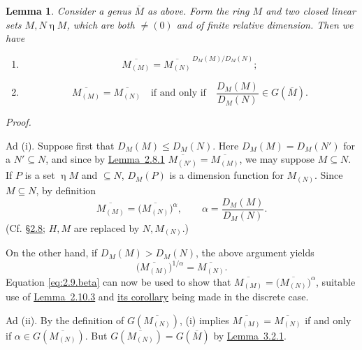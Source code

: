 \documentclass[b5paper,twoside]{article}
\newcommand{\secref}[2]{\hyperref[#1]{\mbox{\S#2}}}
\newcommand{\lemref}[2]{\hyperref[#1]{\mbox{Lemma~#2}}}
\theoremstyle{mvnplain}
\newtheorem{lemma}{Lemma}[section]
\renewenvironment{proof}[1][Proof]{%
  \par\addvspace{0.35\baselineskip}%
  \noindent\textit{#1.}\ \normalfont\ignorespaces
}{%
  \par\addvspace{0.35\baselineskip}%
}
\newcommand{\M}{\mathbf M}
\newcommand{\Hilbert}{\mathfrak H}
\def\M{M}%
\def\Hilbert{H}%
\def\widetilde#1{#1}%
\def\mathfrak#1{#1}%
\begin{document}
\begin{lemma}\label{lem:3.2.2}
Consider a genus \(\widetilde{\overline{\M}}\) as above. Form the ring
\(\M\) and two closed linear sets \(\mathfrak M,\mathfrak N\mathrel{\eta}\M\), which
are both \(\ne(0)\) and of finite relative dimension. Then we have
\begin{enumerate}[label=(\roman*)]
\item
\[
  \overline{\M_{(\mathfrak M)}}
  =\overline{\M_{(\mathfrak N)}}^{\,D_{\M}(\mathfrak M)/D_{\M}(\mathfrak N)};
\]
\item
\[
  \overline{\M_{(\mathfrak M)}}=\overline{\M_{(\mathfrak N)}}
  \quad\text{if and only if}\quad
  \frac{D_{\M}(\mathfrak M)}{D_{\M}(\mathfrak N)}
  \in\mathfrak G(\widetilde{\overline{\M}}).
\]
\end{enumerate}
\end{lemma}

\begin{proof}
Ad (i). Suppose first that
\(D_{\M}(\mathfrak M)\leq D_{\M}(\mathfrak N)\). Here
\(D_{\M}(\mathfrak M)=D_{\M}(\mathfrak N')\) for a
\(\mathfrak N'\subseteq\mathfrak N\), and since by
\lemref{lem:2.8.1}{2.8.1}
\(\overline{\M_{(\mathfrak N')}}=\overline{\M_{(\mathfrak M)}}\), we may
suppose \(\mathfrak M\subseteq\mathfrak N\). If \(\mathfrak P\) is a set
\(\mathrel{\eta}\M\) and \(\subseteq\mathfrak N\), \(D_{\M}(\mathfrak P)\) is a
dimension function for \(\M_{(\mathfrak N)}\). Since
\(\mathfrak M\subseteq\mathfrak N\), by definition
\[
  \overline{\M_{(\mathfrak M)}}
  =\bigl(\overline{\M_{(\mathfrak N)}}\bigr)^\alpha,
  \qquad
  \alpha=\frac{D_{\M}(\mathfrak M)}{D_{\M}(\mathfrak N)}.
\]
(Cf. \secref{sec:2.8}{2.8}; \(\Hilbert,\M\) are replaced by
\(\mathfrak N,\M_{(\mathfrak N)}\).)

On the other hand, if
\(D_{\M}(\mathfrak M)>D_{\M}(\mathfrak N)\), the above argument yields
\[
  \bigl(\overline{\M_{(\mathfrak M)}}\bigr)^{1/\alpha}
  =\overline{\M_{(\mathfrak N)}}.
\]
Equation \eqref{eq:2.9.beta} can now be used to show that
\(\overline{\M_{(\mathfrak M)}}
=\bigl(\overline{\M_{(\mathfrak N)}}\bigr)^\alpha\), suitable use of
\lemref{lem:2.10.3}{2.10.3} and
\hyperref[cor:2.10.3]{its corollary} being made in the discrete case.

Ad (ii). By the definition of
\(\mathfrak G(\overline{\M_{(\mathfrak N)}})\), (i) implies
\(\overline{\M_{(\mathfrak M)}}=\overline{\M_{(\mathfrak N)}}\) if and
only if \(\alpha\in\mathfrak G(\overline{\M_{(\mathfrak N)}})\). But
\(\mathfrak G(\overline{\M_{(\mathfrak N)}})
=\mathfrak G(\widetilde{\overline{\M}})\) by
\lemref{lem:3.2.1}{3.2.1}.
\end{proof}
\end{document}
